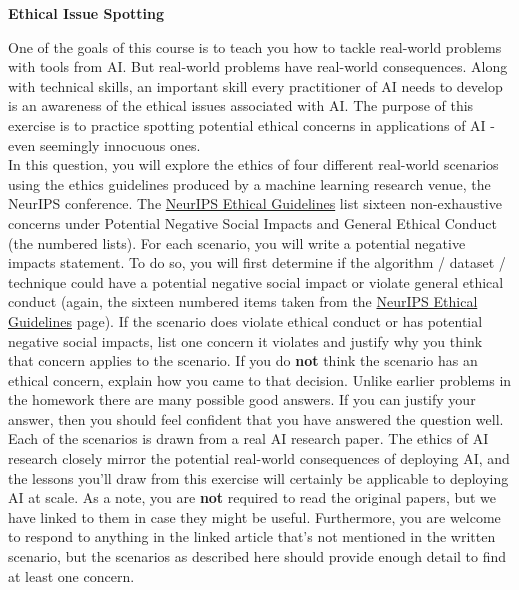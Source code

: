 \item {\bf Ethical Issue Spotting}

One of the goals of this course is to teach you how to tackle real-world problems with tools from AI.  But real-world problems have real-world consequences. Along with technical skills, an important skill every practitioner of AI needs to develop is an awareness of the ethical issues associated with AI. The purpose of this exercise is to practice spotting potential ethical concerns in applications of AI - even seemingly innocuous ones.\\

In this question, you will explore the ethics of four different real-world scenarios using the ethics guidelines produced by a machine learning research venue, the NeurIPS conference. The \href{https://neurips.cc/public/EthicsGuidelines}{NeurIPS Ethical Guidelines} list sixteen non-exhaustive concerns under Potential Negative Social Impacts and General Ethical Conduct (the numbered lists). For each scenario, you will write a potential negative impacts statement. To do so, you will first determine if the algorithm / dataset / technique could have a potential negative
social impact or violate general ethical conduct (again, the sixteen numbered items taken from the \href{https://neurips.cc/public/EthicsGuidelines}{NeurIPS Ethical Guidelines} page). If the scenario does violate ethical conduct or has potential negative social impacts, list one concern it violates and justify why you think that concern applies to the scenario. If you do \textbf{not} think the scenario has an ethical concern, explain how you came to that decision. 
Unlike earlier problems in the homework there are many possible good answers. If you can justify your answer, then you should feel confident that you have answered the question well.\\

Each of the scenarios is drawn from a real AI research paper. The ethics of AI research closely mirror the potential real-world consequences of deploying AI, and the lessons you’ll draw from this exercise will certainly be applicable to deploying AI at scale. As a note, you are \textbf{not} required to read the original papers, but we have linked to them in case they might be useful. Furthermore, you are welcome to respond to anything in the linked article that's not mentioned in the written scenario, but the scenarios as described here should provide enough detail to find at least one concern.\\

